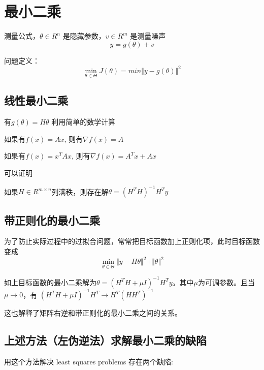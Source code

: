 \section{最小二乘}
测量公式，$\theta \in R^n$ 是隐藏参数，$ v \in R^m $ 是测量噪声
\begin{equation}
  y = g(\theta) + v
\end{equation}

问题定义：
\begin{equation}
  \min_{\theta \in \Theta}J(\theta) = min \Vert y - g(\theta) \Vert ^2
\end{equation}

\subsection{线性最小二乘}
有$g(\theta) = H \theta $
利用简单的数学计算
\begin{theorembox}
	如果有$f(x) = Ax$, 则有$\nabla f(x) = A$
\end{theorembox}
\begin{theorembox}
	如果有$f(x) = x^TAx$, 则有$\nabla f(x) = A^Tx+Ax$
\end{theorembox}
可以证明
\begin{theorembox}
	如果$H\in R^{m\times n}$列满秩，则存在解$\theta = (H^TH)^{-1}H^Ty$ 
\end{theorembox}
\subsection{带正则化的最小二乘}\label{ModernControl::sec::regularized-least-squares}
为了防止实际过程中的过拟合问题，常常把目标函数加上正则化项，此时目标函数变成
\begin{equation*}
	\min_{\theta \in \Theta} \Vert y - H\theta \Vert ^2 + \Vert \theta \Vert ^2
\end{equation*}
\begin{theorembox}
	如上目标函数的最小二乘解为$\theta = (H^TH + \mu I)^{-1}H^Ty$。其中$\mu$为可调参数。且当$\mu \rightarrow 0$，有 $(H^TH + \mu I)^{-1}H^T \rightarrow H^T(HH^T)^{-1}$
\end{theorembox}
这也解释了矩阵右逆和带正则化的最小二乘之间的关系。
\subsection{上述方法（左伪逆法）求解最小二乘的缺陷}
用这个方法解决 least squares problems 存在两个缺陷:

